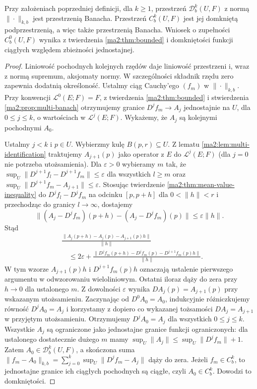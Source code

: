 \begin{twierdzenie}
\label{ma2:thm:bounded-differentiable-open}
Przy założeniach poprzedniej definicji, dla $k\ge1$,
przestrzeń $\mathcal D_b^k(U,F)$ z normą
$\|\cdot\|_{k,b}$ jest przestrzenią Banacha.
Przestrzeń $C_b^k(U,F)$ jest jej domkniętą
podprzestrzenią, a więc także przestrzenią Banacha.
Wniosek o zupełności $C_b^0(U,F)$ wynika
z twierdzenia \ref{ma2:thm:bounded} i domkniętości
funkcji ciągłych względem zbieżności jednostajnej.
\end{twierdzenie}
\begin{proof}
Liniowość pochodnych kolejnych rzędów daje
liniowość przestrzeni i, wraz z normą supremum,
aksjomaty normy. W szczególności składnik rzędu
zero zapewnia dodatnią określoność.
Ustalmy ciąg Cauchy'ego $(f_m)$ w $\|\cdot\|_{k,b}$.
Przy konwencji $\mathcal L^0(E;F)=F$,
z twierdzenia \ref{ma2:thm:bounded} i stwierdzenia
\ref{ma2:prop:multi-banach} otrzymujemy granice
$D^jf_m\to A_j$ jednostajnie na $U$,
dla $0\le j\le k$, o wartościach w
$\mathcal L^j(E;F)$. Wykażemy, że $A_j$ są
kolejnymi pochodnymi $A_0$.

Ustalmy $j<k$ i $p\in U$. Wybierzmy kulę
$B(p,r)\subseteq U$. Z lematu
\ref{ma2:lem:multi-identification} traktujemy
$A_{j+1}(p)$ jako operator z $E$ do
$\mathcal L^j(E;F)$ (dla $j=0$ nie potrzeba
utożsamienia). Dla $\varepsilon>0$ wybieramy $m$
tak, że $\sup_U\|D^{j+1}f_l-D^{j+1}f_m\|
\le\varepsilon$ dla wszystkich $l\ge m$
oraz $\sup_U\|D^{j+1}f_m-A_{j+1}\|
\le\varepsilon$. Stosując twierdzenie
\ref{ma2:thm:mean-value-inequality} do
$D^jf_l-D^jf_m$ na odcinku $[p,p+h]$
dla $0<\|h\|<r$ i przechodząc do granicy
$l\to\infty$, dostajemy
\[
 \|(A_j-D^jf_m)(p+h)-(A_j-D^jf_m)(p)\|
 \le\varepsilon\|h\|.
\]
Stąd
\[
 \begin{aligned}
 &\frac{\|A_j(p+h)-A_j(p)-A_{j+1}(p)h\|}{\|h\|}\\
 &\quad\le 2\varepsilon+
 \frac{\|D^jf_m(p+h)-D^jf_m(p)-D^{j+1}f_m(p)h\|}
 {\|h\|}.
 \end{aligned}
\]
W tym wzorze $A_{j+1}(p)h$ i $D^{j+1}f_m(p)h$
oznaczają ustalenie pierwszego argumentu w odwzorowaniu
wieloliniowym. Ostatni iloraz dąży do zera przy
$h\to0$ dla ustalonego $m$. Z dowolności
$\varepsilon$ wynika $DA_j(p)=A_{j+1}(p)$
przy wskazanym utożsamieniu.
Zaczynając od $D^0A_0=A_0$, indukcyjnie
różniczkujemy równość $D^jA_0=A_j$ i korzystamy
z dopiero co wykazanej tożsamości $DA_j=A_{j+1}$
w przyjętym utożsamieniu. Otrzymujemy
$D^jA_0=A_j$ dla wszystkich $0\le j\le k$.
Wszystkie $A_j$ są ograniczone jako jednostajne granice
funkcji ograniczonych: dla ustalonego dostatecznie dużego
$m$ mamy $\sup_U\|A_j\|\le\sup_U\|D^jf_m\|+1$.
Zatem $A_0\in\mathcal D_b^k(U,F)$, a skończona suma
$\|f_m-A_0\|_{k,b}=\sum_{j=0}^k\sup_U\|D^jf_m-A_j\|$
dąży do zera.
Jeżeli $f_m\in C_b^k$, to jednostajne granice
ich ciągłych pochodnych są ciągłe, czyli
$A_0\in C_b^k$. Dowodzi to domkniętości.
\end{proof}

